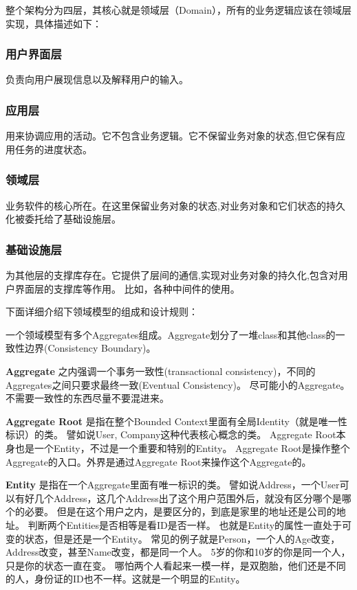 \documentclass[journal]{IEEEtran}
\begin{document}
\begin{CJK*}{UTF8}{gbsn}
整个架构分为四层，其核心就是领域层（Domain），所有的业务逻辑应该在领域层实现，具体描述如下：
 
\subsubsection{用户界面层}
	负责向用户展现信息以及解释用户的输入。
\subsubsection{应用层}
  用来协调应用的活动。它不包含业务逻辑。它不保留业务对象的状态,但它保有应用任务的进度状态。
\subsubsection{领域层}
业务软件的核心所在。在这里保留业务对象的状态,对业务对象和它们状态的持久化被委托给了基础设施层。 


\subsubsection{基础设施层}
   为其他层的支撑库存在。它提供了层间的通信,实现对业务对象的持久化,包含对用户界面层的支撑库等作用。
   比如，各种中间件的使用。

\indent

下面详细介绍下领域模型的组成和设计规则：

\indent

一个领域模型有多个Aggregates组成。Aggregate划分了一堆class和其他class的一致性边界(Consistency Boundary)。

\indent

{\bfseries Aggregate}  之内强调一个事务一致性(transactional consistency)，不同的Aggregates之间只要求最终一致(Eventual Consistency)。
  尽可能小的Aggregate。不需要一致性的东西尽量不要混进来。
  
\indent

{\bfseries Aggregate Root} 
是指在整个Bounded Context里面有全局Identity（就是唯一性标识）的类。
譬如说User, Company这种代表核心概念的类。
Aggregate Root本身也是一个Entity，不过是一个重要和特别的Entity。
Aggregate Root是操作整个Aggregate的入口。外界是通过Aggregate Root来操作这个Aggregate的。

\indent

{\bfseries   Entity }是指在一个Aggregate里面有唯一标识的类。
譬如说Address，一个User可以有好几个Address，这几个Address出了这个用户范围外后，就没有区分哪个是哪个的必要。
但是在这个用户之内，是要区分的，到底是家里的地址还是公司的地址。
判断两个Entities是否相等是看ID是否一样。
也就是Entity的属性一直处于可变的状态，但是还是一个Entity。
常见的例子就是Person，一个人的Age改变，Address改变，甚至Name改变，都是同一个人。
5岁的你和10岁的你是同一个人，只是你的状态一直在变。
哪怕两个人看起来一模一样，是双胞胎，他们还是不同的人，身份证的ID也不一样。这就是一个明显的Entity。
   

\end{CJK*}
\end{document}
